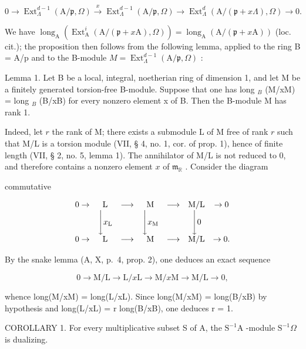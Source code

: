 \[
0 \rightarrow \operatorname{Ext} _ {\Lambda} ^ {d - 1} (\mathrm{A} / \mathfrak {p}, \Omega) \xrightarrow {x} \operatorname{Ext} _ {\Lambda} ^ {d - 1} (\mathrm{A} / \mathfrak {p}, \Omega) \longrightarrow \operatorname{Ext} _ {\Lambda} ^ {d} (\mathrm{A} / (\mathfrak {p} + x \Lambda), \Omega) \rightarrow 0.
\]

We have \(\operatorname{long}_{\mathrm{A}}(\operatorname{Ext}_{\mathrm{A}}^{i}(\mathrm{A}/(\mathfrak{p}+x\mathrm{A}),\Omega))=\operatorname{long}_{\mathrm{A}}(\mathrm{A}/(\mathfrak{p}+x\mathrm{A}))\) (loc. cit.); the proposition then follows from the following lemma, applied to the ring B = A/p and to the B-module \(M=\operatorname{Ext}_{\Lambda}^{d-1}(\mathrm{A}/\mathfrak{p},\Omega)\) :

Lemma 1. Let B be a local, integral, noetherian ring of dimension 1, and let M be a finitely generated torsion-free B-module. Suppose that one has long \(_{B}\) (M/xM) = long \(_{B}\) (B/xB) for every nonzero element x of B. Then the B-module M has rank 1.

Indeed, let \(r\) the rank of M; there exists a submodule L of M free of rank \(r\) such that M/L is a torsion module (VII, § 4, no. 1, cor. of prop. 1), hence of finite length (VII, § 2, no. 5, lemma 1). The annihilator of M/L is not reduced to 0, and therefore contains a nonzero element \(x\) of \(\mathfrak{m}_{\mathbb{R}}\) . Consider the diagram

commutative

\[
\begin{array}{c c c c c c c} 0 \to & \mathrm{L} & \longrightarrow & \mathrm{M} & \longrightarrow & \mathrm{M} / \mathrm{L} & \to 0 \\ & \Biggl \downarrow x _ {\mathrm{L}} & & \Biggl \downarrow x _ {\mathrm{M}} & & \Biggl \downarrow 0 \\ 0 \to & \mathrm{L} & \longrightarrow & \mathrm{M} & \longrightarrow & \mathrm{M} / \mathrm{L} & \to 0. \end{array}
\]

By the snake lemma (A, X, p.~4, prop. 2), one deduces an exact sequence

\[
0 \rightarrow \mathrm{M} / \mathrm{L} \longrightarrow \mathrm{L} / x \mathrm{L} \longrightarrow \mathrm{M} / x \mathrm{M} \longrightarrow \mathrm{M} / \mathrm{L} \rightarrow 0,
\]

whence long(M/xM) = long(L/xL). Since long(M/xM) = long(B/xB) by hypothesis and long(L/xL) = r long(B/xB), one deduces r = 1.

COROLLARY 1. For every multiplicative subset S of A, the \(\mathrm{S}^{-1}\mathrm{A}\) -module \(\mathrm{S}^{-1}\Omega\) is dualizing.

